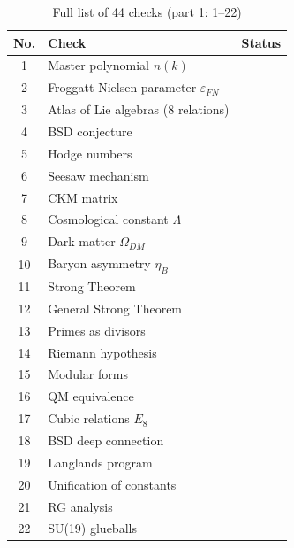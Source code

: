 \documentclass[12pt,a4paper,twoside]{article}
\newcommand{\EPS}{\varepsilon}
\newcommand{\checkmarkgreen}{\textcolor{emerald}{\checkmark}}
\theoremstyle{definition}
\begin{document}
\begin{table}[H]
\centering
\small
\caption{Full list of 44 checks (part 1: 1--22)}
\label{tab:44_breakdown_a}
\begin{tabular}{c|l|c}
\toprule
\textbf{No.} & \textbf{Check} & \textbf{Status} \\
\midrule
1 & Master polynomial $n(k)$ & \checkmarkgreen \\
2 & Froggatt-Nielsen parameter $\EPS_{FN}$ & \checkmarkgreen \\
3 & Atlas of Lie algebras (8 relations) & \checkmarkgreen \\
4 & BSD conjecture & \checkmarkgreen \\
5 & Hodge numbers & \checkmarkgreen \\
6 & Seesaw mechanism & \checkmarkgreen \\
7 & CKM matrix & \checkmarkgreen \\
8 & Cosmological constant $\Lambda$ & \checkmarkgreen \\
9 & Dark matter $\Omega_{DM}$ & \checkmarkgreen \\
10 & Baryon asymmetry $\eta_B$ & \checkmarkgreen \\
11 & Strong Theorem & \checkmarkgreen \\
12 & General Strong Theorem & \checkmarkgreen \\
13 & Primes as divisors & \checkmarkgreen \\
14 & Riemann hypothesis & \checkmarkgreen \\
15 & Modular forms & \checkmarkgreen \\
16 & QM equivalence & \checkmarkgreen \\
17 & Cubic relations $E_8$ & \checkmarkgreen \\
18 & BSD deep connection & \checkmarkgreen \\
19 & Langlands program & \checkmarkgreen \\
20 & Unification of constants & \checkmarkgreen \\
21 & RG analysis & \checkmarkgreen \\
22 & SU(19) glueballs & \checkmarkgreen \\
\bottomrule
\end{tabular}
\end{table}
\end{document}
